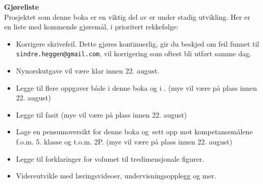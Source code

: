 \newpage
\textbf{Gjøreliste} \\
Prosjektet som denne boka er en viktig del av er under stadig utvikling. Her er en liste med kommende gjøremål, i prioritert rekkefølge:
\begin{itemize}
	\item Korrigere skrivefeil. Dette gjøres kontinuerlig, gir du beskjed om feil funnet til {\tt sindre.heggen@gmail.com}, vil korrigering som oftest bli utført samme dag.
	\item Nynorskutgave vil være klar innen 22. august.
	\item Legge til flere oppgaver både i denne boka og i \mb. (mye vil være på plass innen 22. august)
	\item Legge til fasit (mye vil være på plass innen 22. august)
	\item Lage en pensumoversikt for denne boka og \mb\,sett opp mot kompetansemålene f.o.m. 5. klasse og t.o.m. 2P. (mye vil være på plass innen 22. august)
	\item Legge til forklaringer for volumet til tredimensjonale figurer.
	\item Videreutvikle  med læringsvideoer, undervisningsopplegg og mer. 
\end{itemize}
\newpage

